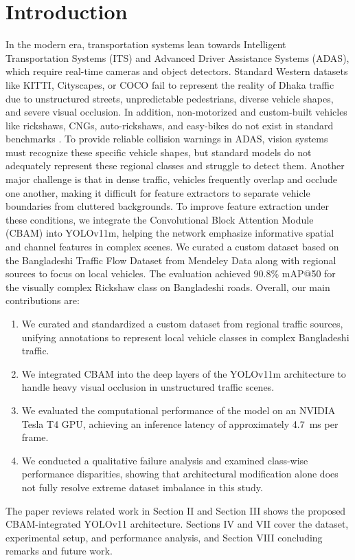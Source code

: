 \documentclass[sigconf]{acmart}
\begin{document}
\section{Introduction}
In the modern era, transportation systems lean towards Intelligent Transportation Systems (ITS) and Advanced Driver Assistance Systems (ADAS), which require real-time cameras and object detectors. Standard Western datasets like KITTI\cite{1a}, Cityscapes\cite{2a}, or COCO\cite{3a} fail to represent the reality of Dhaka traffic due to unstructured streets, unpredictable pedestrians, diverse vehicle shapes, and severe visual occlusion. In addition, non-motorized and custom-built vehicles like rickshaws, CNGs, auto-rickshaws, and easy-bikes do not exist in standard benchmarks \cite{Hasan2021VehicleClassification}. To provide reliable collision warnings in ADAS, vision systems must recognize these specific vehicle shapes, but standard models do not adequately represent these regional classes and struggle to detect them. Another major challenge is that in dense traffic, vehicles frequently overlap and occlude one another, making it difficult for feature extractors to separate vehicle boundaries from cluttered backgrounds. To improve feature extraction under these conditions, we integrate the Convolutional Block Attention Module (CBAM)\cite{Woo2018CBAM} into YOLOv11m, helping the network emphasize informative spatial and channel features in complex scenes. We curated a custom dataset based on the Bangladeshi Traffic Flow Dataset from Mendeley Data\cite{Islam2025BangladeshiTrafficFlow} along with regional sources to focus on local vehicles. The evaluation achieved 90.8\% mAP@50 for the visually complex Rickshaw class on Bangladeshi roads.
Overall, our main contributions are:
\begin{enumerate}
    \item We curated and standardized a custom dataset from regional traffic sources, unifying annotations to represent local vehicle classes in complex Bangladeshi traffic.
    \item We integrated CBAM into the deep layers of the YOLOv11m architecture to handle heavy visual occlusion in unstructured traffic scenes.
    \item We evaluated the computational performance of the model on an NVIDIA Tesla T4 GPU, achieving an inference latency of approximately 4.7~ms per frame.
    \item We conducted a qualitative failure analysis and examined class-wise performance disparities, showing that architectural modification alone does not fully resolve extreme dataset imbalance in this study.
\end{enumerate}
The paper reviews related work in Section II and Section III shows the proposed CBAM-integrated YOLOv11 architecture. Sections IV and VII cover the dataset, experimental setup, and performance analysis, and  Section VIII concluding remarks and future work.
\end{document}
